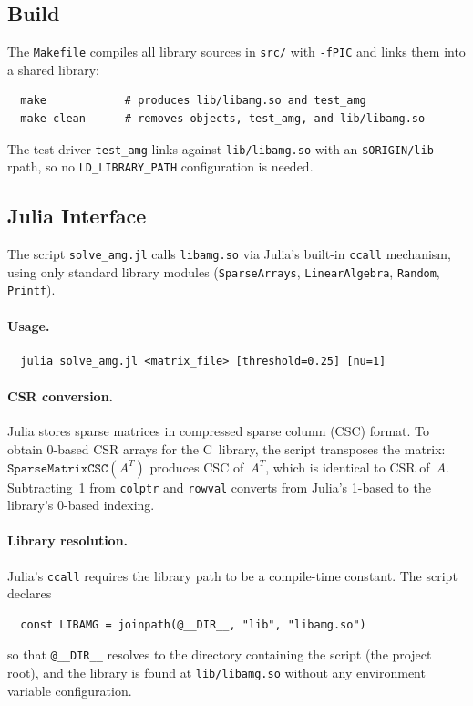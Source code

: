 \documentclass[11pt]{article}
\begin{document}
\subsection{Build}

The \texttt{Makefile} compiles all library sources in \texttt{src/}
with \texttt{-fPIC} and links them into a shared library:
\begin{verbatim}
  make            # produces lib/libamg.so and test_amg
  make clean      # removes objects, test_amg, and lib/libamg.so
\end{verbatim}
The test driver \texttt{test\_amg} links against \texttt{lib/libamg.so}
with an \verb|$ORIGIN/lib| rpath, so no \texttt{LD\_LIBRARY\_PATH}
configuration is needed.

\subsection{Julia Interface}

The script \texttt{solve\_amg.jl} calls \texttt{libamg.so} via Julia's
built-in \texttt{ccall} mechanism, using only standard library modules
(\texttt{SparseArrays}, \texttt{LinearAlgebra}, \texttt{Random},
\texttt{Printf}).

\paragraph{Usage.}
\begin{verbatim}
  julia solve_amg.jl <matrix_file> [threshold=0.25] [nu=1]
\end{verbatim}

\paragraph{CSR conversion.}
Julia stores sparse matrices in compressed sparse column (CSC) format.
To obtain 0-based CSR arrays for the C~library, the script transposes
the matrix: $\texttt{SparseMatrixCSC}(A^T)$ produces CSC of~$A^T$,
which is identical to CSR of~$A$.  Subtracting~1 from
\texttt{colptr} and \texttt{rowval} converts from Julia's 1-based
to the library's 0-based indexing.

\paragraph{Library resolution.}
Julia's \texttt{ccall} requires the library path to be a compile-time
constant.  The script declares
\begin{verbatim}
  const LIBAMG = joinpath(@__DIR__, "lib", "libamg.so")
\end{verbatim}
so that \texttt{@\_\_DIR\_\_} resolves to the directory containing the
script (the project root), and the library is found at
\texttt{lib/libamg.so} without any environment variable configuration.
\end{document}
